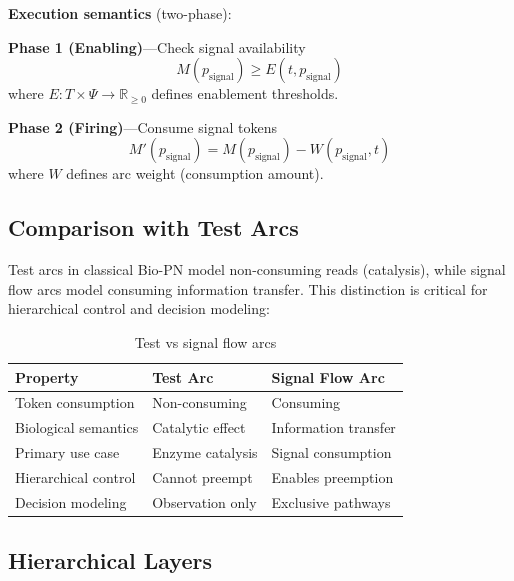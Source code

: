 \vspace{3pt}
\noindent\textbf{Execution semantics} (two-phase):

\noindent\textbf{Phase 1 (Enabling)}---Check signal availability
\begin{equation}
\label{eq:signal_enable}
M(p_{\text{signal}}) \geq E(t, p_{\text{signal}})
\end{equation}
where $E: T \times \Psi \to \mathbb{R}_{\geq 0}$ defines enablement thresholds.

\noindent\textbf{Phase 2 (Firing)}---Consume signal tokens
\begin{equation}
\label{eq:signal_consume}
M'(p_{\text{signal}}) = M(p_{\text{signal}}) - W(p_{\text{signal}}, t)
\end{equation}
where $W$ defines arc weight (consumption amount).

\subsection{Comparison with Test Arcs}

Test arcs in classical Bio-PN model non-consuming reads (catalysis), while signal flow arcs model consuming information transfer. This distinction is critical for hierarchical control and decision modeling:

\begin{table}[h]
\caption{Test vs signal flow arcs}
\label{tab:test_vs_signal}
\centering
\small
\begin{tabular}{@{}p{}p{}p{}@{}}
\toprule
\textbf{Property} & \textbf{Test Arc} & \textbf{Signal Flow Arc} \\
\midrule
Token consumption & Non-consuming & Consuming \\
Biological semantics & Catalytic effect & Information transfer \\
Primary use case & Enzyme catalysis & Signal consumption \\
Hierarchical control & Cannot preempt & Enables preemption \\
Decision modeling & Observation only & Exclusive pathways \\
\bottomrule
\end{tabular}
\end{table}

\vspace{3pt}
\subsection{Hierarchical Layers}

